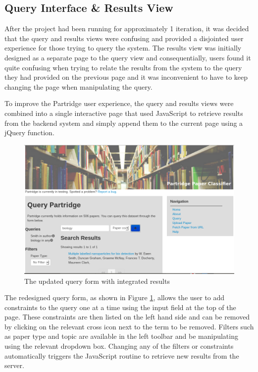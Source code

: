 \subsection{Query Interface \& Results View}

After the project had been running for approximately 1 iteration, it was
decided that the query and results views were confusing and provided a
disjointed user experience for those trying to query the system. The results
view was initially designed as a separate page to the query view and
consequentially, users found it quite confusing when trying to relate the
results from the system to the query they had provided on the previous page and
it was inconvenient to have to keep changing the page when manipulating the
query. 

To improve the Partridge user experience, the query and results views were
combined into a single interactive page that used JavaScript to retrieve
results from the backend system and simply append them to the current page
using a jQuery function.

\begin{figure}[!h]
\centering
\includegraphics[width=\textwidth]{images/implementation/queryform_actual.png}
\caption{The updated query form with integrated results}
\label{fig:queryform_actual}
\end{figure}

The redesigned query form, as shown in Figure \ref{fig:queryform_actual},
allows the user to add constraints to the query one at a time using the input
field at the top of the page. These constraints are then listed on the left
hand side and can be removed by clicking on the relevant cross icon next to the
term to be removed. Filters such as paper type and topic are available in the
left toolbar and be manipulating using the relevant dropdown box. Changing any
of the filters or constraints automatically triggers the JavaScript routine to
retrieve new results from the server.

